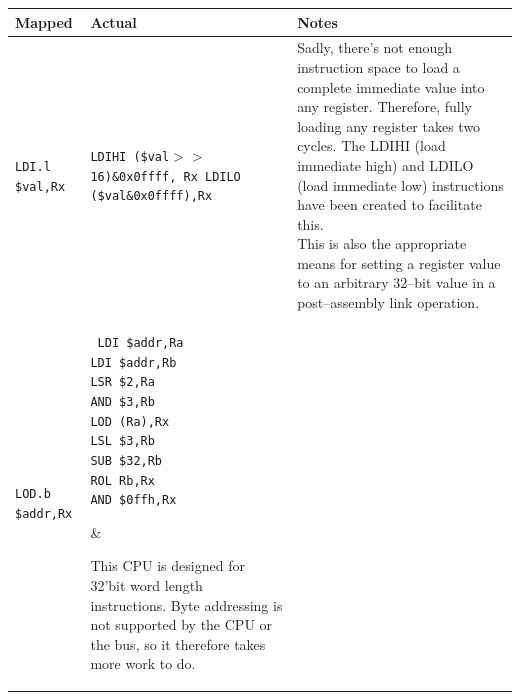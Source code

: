 \documentclass{gqtekspec}
\begin{document}
\begin{table}\begin{center}
\begin{tabular}{p{1.4in}p{1.5in}p{3in}}\\\hline
Mapped & Actual  & Notes \\\hline
{\tt LDI.l \$val,Rx }
	& \parbox[t]{1.8in}{\tt LDIHI (\$val$>>$16)\&0x0ffff, Rx \\
			LDILO (\$val\&0x0ffff),Rx}
	& \parbox[t]{3.0in}{Sadly, there's not enough instruction
		space to load a complete immediate value into any register.
		Therefore, fully loading any register takes two cycles.
		The LDIHI (load immediate high) and LDILO (load immediate low)
		instructions have been created to facilitate this.
		\\
	This is also the appropriate means for setting a register value
	to an arbitrary 32--bit value in a post--assembly link
	operation.}\\\hline
{\tt LOD.b \$addr,Rx}
	& \parbox[t]{1.5in}{\tt %
	LDI	\$addr,Ra \\
	LDI	\$addr,Rb \\
	LSR	\$2,Ra \\
	AND	\$3,Rb \\
	LOD	(Ra),Rx \\
	LSL	\$3,Rb \\
	SUB	\$32,Rb \\
	ROL	Rb,Rx \\
	AND \$0ffh,Rx}
	& \parbox[t]{3in}{This CPU is designed for 32'bit word
	length instructions.  Byte addressing is not supported by the CPU or
	the bus, so it therefore takes more work to do. 

}
\end{tabular}
\end{center}
\end{table}
\end{document}

